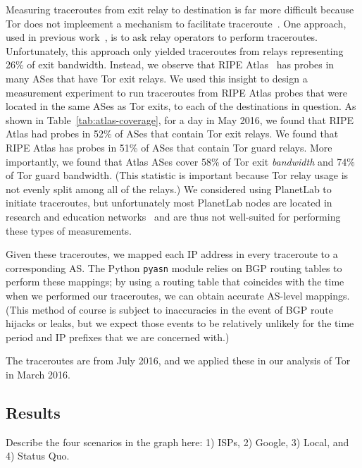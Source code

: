 Measuring traceroutes from exit relay to destination is far more
difficult because Tor does not impleement a mechanism to facilitate
traceroute~\cite{Murdoch2007a}. One approach, used in previous
work~\cite{Juen2015a}, is to ask relay operators to perform traceroutes.
Unfortunately, this approach only yielded traceroutes from relays
representing 26\% of exit bandwidth.  Instead, we observe that RIPE
Atlas~\cite{atlas} has probes in many ASes that have Tor exit relays.
We used this insight to design a measurement experiment to run
traceroutes from RIPE Atlas probes that were located in the same ASes as
Tor exits, to each of the destinations in question.  As shown in
Table~\ref{tab:atlas-coverage}, for a day in May 2016, we found that
RIPE Atlas had probes in 52\% of ASes that contain Tor exit relays.  We
found that RIPE Atlas has probes in 51\% of ASes that contain Tor guard
relays.  More importantly, we found that Atlas ASes cover 58\% of Tor
exit \textit{bandwidth} and 74\% of Tor guard bandwidth. (This statistic
is important because Tor relay usage is not evenly split among all of
the relays.) We considered using PlanetLab to initiate traceroutes, but
unfortunately most PlanetLab nodes are located in research and education
networks~\cite{banerjee2004interdomain} and are thus not well-suited for
performing these types of measurements.

Given these traceroutes, we mapped each IP address in every traceroute
to a corresponding AS.  The Python {\tt pyasn} module relies on BGP
routing tables to perform these mappings; by using a routing table that
coincides with the time when we performed our traceroutes, we can obtain
accurate AS-level mappings.  (This method of course is subject to
inaccuracies in the event of BGP route hijacks or leaks, but we expect
those events to be relatively unlikely for the time period and IP
prefixes that we are concerned with.)

The traceroutes are from July 2016, and we applied these in our analysis of Tor 
in March 2016.  



\subsection{Results}

Describe the four scenarios in the graph here: 1) ISPs, 2) Google, 3) Local, and 
4) Status Quo.

